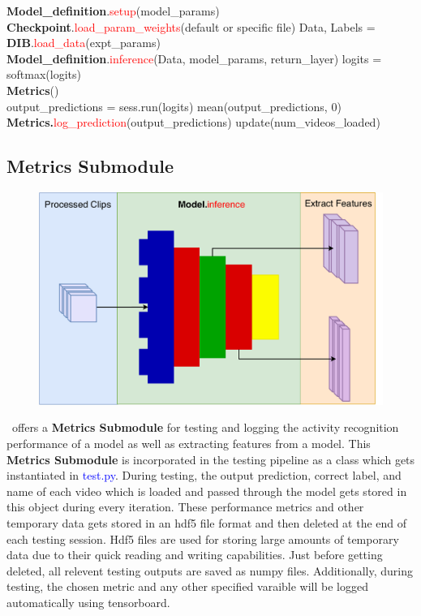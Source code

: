 \documentclass{llncs}
\begin{document}
\begin{algorithmic}[H]
\State \textbf{Model\_definition}.\textcolor{red}{setup}(model\_params)
\State \textbf{Checkpoint}.\textcolor{red}{load\_param\_weights}(default or specific file)
\State Data, Labels = \textbf{DIB}.\textcolor{red}{load\_data}(expt\_params)
\\
\State \textbf{Model\_definition}.\textcolor{red}{inference}(Data, model\_params, return\_layer)
\State logits = softmax(logits)
\EndIf
\EndFor
\\
\State \textbf{Metrics}()
\\
\State output\_predictions = sess.run(logits)
\State mean(output\_predictions, 0)
\EndIf
\State \textbf{Metrics.}\textcolor{red}{log\_prediction}(output\_predictions)
\State update(num\_videos\_loaded)
\EndWhile
\EndProcedure
\end{algorithmic}

\subsection{Metrics Submodule}
\label{sec:metrics}

\begin{figure}[t!]
\centering
\includegraphics[width=0.7\columnwidth]{images/extract_features_h.pdf}
\caption{}
\label{fig:extract_features}
\end{figure}

\acro~offers a \textbf{Metrics Submodule} for testing and logging the activity recognition performance of a model as well as extracting features from a model.
This \textbf{Metrics Submodule} is incorporated in the testing pipeline as a class which gets instantiated in \textcolor{blue}{test.py}.
During testing, the output prediction, correct label, and name of each video which is loaded and passed through the model gets stored in this object during every iteration.
These performance metrics and other temporary data gets stored in an hdf5 file format and then deleted at the end of each testing session.
Hdf5 files are used for storing large amounts of temporary data due to their quick reading and writing capabilities.
Just before getting deleted, all relevent testing outputs are saved as numpy files.
Additionally, during testing, the chosen metric and any other specified varaible will be logged automatically using tensorboard.
\end{document}
